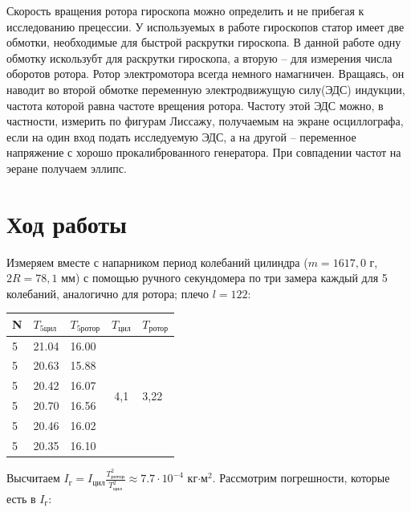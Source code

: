 \documentclass[a4paper,12pt]{article}
\begin{document}
	Скорость вращения ротора гироскопа можно определить и не прибегая к исследованию прецессии. У используемых в работе гироскопов статор имеет две обмотки, необходимые для быстрой раскрутки гироскопа. В данной работе одну обмотку искользубт для раскрутки гироскопа, а вторую -- для измерения числа оборотов ротора. Ротор электромотора всегда немного намагничен. Вращаясь, он наводит во второй обмотке переменную электродвижущую силу(ЭДС) индукции, частота которой равна частоте врещения ротора. Частоту этой ЭДС можно, в частности, измерить по фигурам Лиссажу, получаемым на экране осциллографа, если на один вход подать исследуемую ЭДС, а на другой -- переменное напряжение с хорошо прокалиброванного генератора. При совпадении частот на эеране получаем эллипс.
	
	\section{Ход работы}
	Измеряем вместе с напарником период колебаний цилиндра ($m=1617,0$ г, $2R=78,1$ мм) с помощью ручного секундомера по три замера каждый для 5 колебаний, аналогично для ротора; плечо $l=122$:
	
	
	\begin{table}[h]
		\centering
		\begin{tabular}{|l|l|l|c|l|}
			\hline
			N & $T_\text{5цил}$ & $T_{5\text{ротор}}$ & \multicolumn{1}{l|}{$T_\text{цил}$} & $T_\text{ротор}$                \\ \hline
			5 & 21.04 & 16.00   & \multirow{6}{*}{4,1}      & \multirow{6}{*}{3,22} \\ \cline{1-3}
			5 & 20.63 & 15.88   &                           &                       \\ \cline{1-3}
			5 & 20.42 & 16.07   &                           &                       \\ \cline{1-3}
			5 & 20.70 & 16.56   &                           &                       \\ \cline{1-3}
			5 & 20.46 & 16.02   &                           &                       \\ \cline{1-3}
			5 & 20.35 & 16.10   &                           &                       \\ \hline
		\end{tabular}
	\end{table}
	Высчитаем $I_\text{г}=I_{\text{цил}}\frac{T_{\text{ротор}}^{2}}{T_{\text{цил}}^{2}}\approx 7.7\cdot 10^{-4}$ кг$\cdot\text{м}^2$. Рассмотрим погрешности, которые есть в $I_\text{г}$:
	
\end{document}
